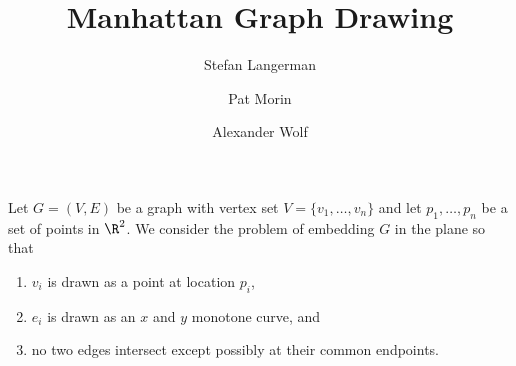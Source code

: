 \documentclass[lotsofwhite]{patmorin}
\title{Manhattan Graph Drawing}
\author{Stefan Langerman \and Pat Morin \and Alexander Wolf}
\date{}
\begin{document}
\maketitle

Let $G=(V,E)$ be a graph with vertex set $V=\{v_1,\ldots,v_n\}$ and let
$p_1,\ldots,p_n$ be a set of points in $\R^2$.  We consider the
problem of embedding $G$ in the plane so that
\begin{enumerate}
\item $v_i$ is drawn as a point at location $p_i$,
\item $e_i$ is drawn as an $x$ and $y$ monotone curve, and
\item no two edges intersect except possibly at their common endpoints.
\end{enumerate}
\end{document}
